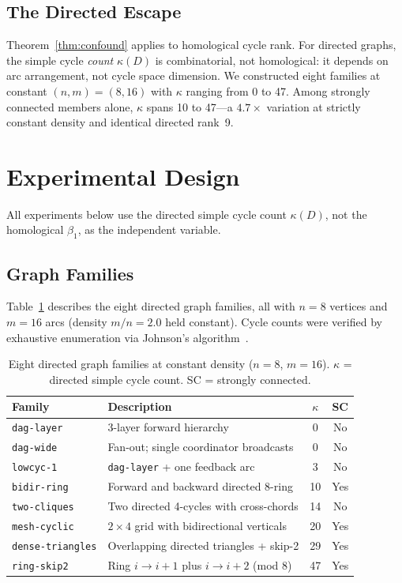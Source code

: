 \documentclass{llncs}
\begin{document}
\subsection{The Directed Escape}

Theorem~\ref{thm:confound} applies to homological cycle rank. For directed
graphs, the simple cycle \emph{count} $\kappa(D)$ is combinatorial, not
homological: it depends on arc arrangement, not cycle space dimension.
We constructed eight families at constant $(n, m) = (8, 16)$ with $\kappa$
ranging from 0 to 47. Among strongly connected members alone, $\kappa$ spans
10 to 47---a $4.7\times$ variation at strictly constant density and identical
directed rank~9.

\section{Experimental Design}
\label{sec:design}

All experiments below use the directed simple cycle count $\kappa(D)$, not the
homological $\beta_1$, as the independent variable.

\subsection{Graph Families}

Table~\ref{tab:families} describes the eight directed graph families, all with
$n = 8$ vertices and $m = 16$ arcs (density $m/n = 2.0$ held constant). Cycle
counts were verified by exhaustive enumeration via Johnson's
algorithm~\cite{johnson1975finding}.

\begin{table}[t]
\centering
\caption{Eight directed graph families at constant density ($n=8$, $m=16$).
$\kappa$ = directed simple cycle count. SC = strongly connected.}
\label{tab:families}
\begin{tabular}{llcc}
\toprule
Family & Description & $\kappa$ & SC \\
\midrule
\texttt{dag-layer}      & 3-layer forward hierarchy                  &  0 & No  \\
\texttt{dag-wide}       & Fan-out; single coordinator broadcasts     &  0 & No  \\
\texttt{lowcyc-1}       & \texttt{dag-layer} + one feedback arc      &  3 & No  \\
\texttt{bidir-ring}     & Forward and backward directed 8-ring       & 10 & Yes \\
\texttt{two-cliques}    & Two directed 4-cycles with cross-chords    & 14 & No  \\
\texttt{mesh-cyclic}    & $2\times4$ grid with bidirectional verticals & 20 & Yes \\
\texttt{dense-triangles}& Overlapping directed triangles + skip-2    & 29 & Yes \\
\texttt{ring-skip2}     & Ring $i{\to}i{+}1$ plus $i{\to}i{+}2$ (mod 8) & 47 & Yes \\
\bottomrule
\end{tabular}
\end{table}
\end{document}
